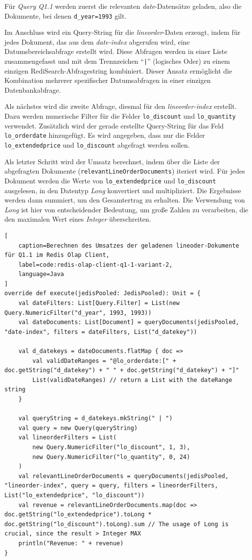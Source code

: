 Für \emph{Query Q1.1} werden zuerst die relevanten \emph{date}-Datensätze geladen, also die Dokumente, bei denen \lstinline|d_year=1993| gilt.

Im Anschluss wird ein Query-String für die \emph{lineorder}-Daten erzeugt, indem für jedes Dokument, das aus dem \emph{date-index} abgerufen wird, eine Datumsbereichsabfrage erstellt wird. Diese Abfragen werden in einer Liste zusammengefasst und mit dem Trennzeichen \enquote{\lstinline+|+} (logisches Oder) zu einem einzigen RediSearch-Abfragestring kombiniert. Dieser Ansatz ermöglicht die Kombination mehrerer spezifischer Datumsabfragen in einer einzigen Datenbankabfrage.

Als nächstes wird die zweite Abfrage, diesmal für den \emph{lineorder-index} erstellt. Dazu werden numerische Filter für die Felder \lstinline|lo_discount| und \lstinline|lo_quantity| verwendet. Zusätzlich wird der gerade erstellte Query-String für das Feld \lstinline|lo_orderdate| hinzugefügt. Es wird angegeben, dass nur die Felder \lstinline|lo_extendedprice| und \lstinline|lo_discount| abgefragt werden sollen.

Als letzter Schritt wird der Umsatz berechnet, indem über die Liste der abgefragten Dokumente (\lstinline|relevantLineOrderDocuments|) iteriert wird. Für jedes Dokument werden die Werte von \lstinline|lo_extendedprice| und \lstinline|lo_discount| ausgelesen, in den Datentyp \emph{Long} konvertiert und multipliziert. Die Ergebnisse werden dann summiert, um den Gesamtertrag zu erhalten. Die Verwendung von \emph{Long} ist hier von entscheidender Bedeutung, um große Zahlen zu verarbeiten, die den maximalen Wert eines \emph{Integer} überschreiten.

\begin{lstlisting}[
    caption=Berechnen des Umsatzes der geladenen lineoder-Dokumente für Q1.1 im Redis Olap Client,
    label=code:redis-olap-client-q1-1-variant-2,
    language=Java
]
override def execute(jedisPooled: JedisPooled): Unit = {
	val dateFilters: List[Query.Filter] = List(new Query.NumericFilter("d_year", 1993, 1993))
	val dateDocuments: List[Document] = queryDocuments(jedisPooled, "date-index", filters = dateFilters, List("d_datekey"))

	val d_datekeys = dateDocuments.flatMap { doc =>
		val validDateRanges = "@lo_orderdate:[" + doc.getString("d_datekey") + " " + doc.getString("d_datekey") + "]"
		List(validDateRanges) // return a List with the dateRange string
	}

	val queryString = d_datekeys.mkString(" | ")
	val query = new Query(queryString)
	val lineorderFilters = List(
		new Query.NumericFilter("lo_discount", 1, 3),
		new Query.NumericFilter("lo_quantity", 0, 24)
	)
	val relevantLineOrderDocuments = queryDocuments(jedisPooled, "lineorder-index", query = query, filters = lineorderFilters, List("lo_extendedprice", "lo_discount"))
	val revenue = relevantLineOrderDocuments.map(doc => doc.getString("lo_extendedprice").toLong * doc.getString("lo_discount").toLong).sum // The usage of Long is crucial, since the result > Integer MAX
	println("Revenue: " + revenue)
}
\end{lstlisting}



